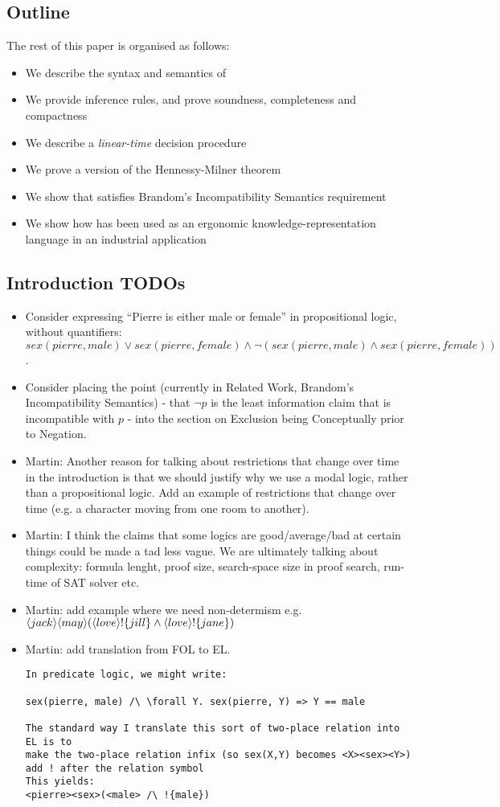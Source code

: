 \subsection{Outline}
The rest of this paper is organised as follows:
\begin{itemize}
\item
We describe the syntax and semantics of \ELFULL{}
\item
We provide inference rules, and prove soundness, completeness and compactness
\item
We describe a \emph{linear-time} decision procedure
\item
We prove a version of the Hennessy-Milner theorem
\item
We show that \ELFULL{} satisfies Brandom's Incompatibility Semantics requirement
\item
We show how \ELFULL{} has been used as an ergonomic knowledge-representation language in an industrial application
\end{itemize}

\subsection{Introduction TODOs}

\begin{itemize}
\item Consider expressing ``Pierre is either male or female'' in propositional logic, without quantifiers:
$sex(pierre, male) \lor sex(pierre, female) \land \neg (sex(pierre, male) \land sex(pierre, female))$.
\item
Consider placing the point (currently in Related Work, Brandom's Incompatibility Semantics) - that $\neg p$ is the least information claim that is incompatible with $p$ - into the section on Exclusion being Conceptually prior to Negation.
\item
Martin: Another reason for talking about restrictions that change over time in
the introduction is that we should justify why we use a modal logic,
rather than a propositional logic. Add an example of restrictions that change over time (e.g. a character moving from one room to another).
\item
Martin: I think the claims that some logics are good/average/bad at certain things
could be made a tad less vague. We are ultimately talking about
complexity: formula lenght, proof size, search-space size in proof
search, run-time of SAT solver etc.
\item
Martin: add example where we need non-determism e.g. $\langle jack \rangle \langle may \rangle (\langle love \rangle !\{jill\} \land \langle love \rangle !\{jane\})$
\item 
Martin: add translation from FOL to EL. 
\begin{verbatim}
In predicate logic, we might write:

sex(pierre, male) /\ \forall Y. sex(pierre, Y) => Y == male

The standard way I translate this sort of two-place relation into EL is to
make the two-place relation infix (so sex(X,Y) becomes <X><sex><Y>)
add ! after the relation symbol
This yields:
<pierre><sex>(<male> /\ !{male})
\end{verbatim}
\end{itemize}